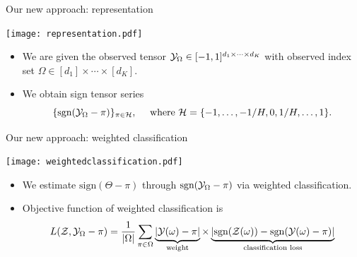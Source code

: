 \documentclass[10pt, mathserif]{beamer} %
\theoremstyle{definition}
\theoremstyle{plain}
\begin{document}
\begin{frame}{Our new approach: representation}
  \begin{center}
    \texttt{[image: representation.pdf]}
    \end{center}
\begin{itemize}
    \item We are given the observed tensor $\mathcal{Y}_\Omega\in[-1,1]^{d_1\times \cdots\times d_K}$ with observed index set $\Omega\in[d_1]\times\cdots\times[d_K]$.
    \item We obtain sign tensor series \[\{\text{sgn}(\mathcal{Y}_\Omega-\pi)\}_{\pi\in\mathcal{H}},\quad \text{ where } \mathcal{H}= \{-1,\ldots,-1/H,0,1/H,\ldots,1\}.\]
\end{itemize}
    
\end{frame}
\begin{frame}{Our new approach: weighted classification}
    \begin{center}
    \texttt{[image: weightedclassification.pdf]}
    \end{center}
    \begin{itemize}
    \item We estimate $\text{sign}(\Theta-\pi)$ through $\text{sgn}(\mathcal{Y}_\Omega-\pi)$ via weighted classification.
    \item Objective function of weighted classification is
    \begin{align}
    L(\mathcal{Z},\mathcal{Y}_\Omega-\pi) = \frac{1}{|\Omega|}\sum_{\pi\in\Omega}\underbrace{|\mathcal{Y}(\omega)-\pi|}_{\text{weight}}\times\underbrace{ |\text{sgn}(\mathcal{Z}(\omega))-\text{sgn}(\mathcal{Y}(\omega)-\pi)|}_{\text{classification loss}}
    \end{align}
    \end{itemize}
\end{frame}
\end{document}
